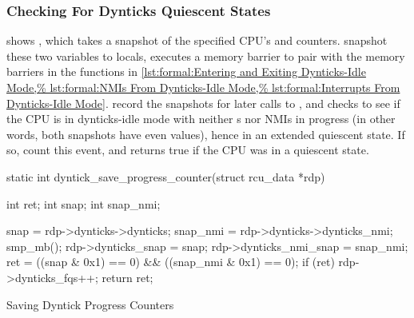\subsubsection{Checking For Dynticks Quiescent States}
\label{sec:formal:Checking For Dynticks Quiescent States}

\begin{fcvref}
shows , which takes a snapshot
of the specified CPU's  and 
counters.
 snapshot these two variables to locals, 
executes a memory barrier to pair with the memory barriers in the functions in
\cref{lst:formal:Entering and Exiting Dynticks-Idle Mode,%
lst:formal:NMIs From Dynticks-Idle Mode,%
lst:formal:Interrupts From Dynticks-Idle Mode}.
 record the snapshots for later calls to
,
and  checks to see if the CPU is in dynticks-idle mode with
neither \IRQ s nor NMIs in progress (in other words, both snapshots
have even values), hence in an extended quiescent state.
If so,  count this event, and  returns
true if the CPU was in a quiescent state.
\end{fcvref}

\begin{listing}
\begin{fcvlabel}
\begin{VerbatimL}[commandchars=\\\[\]]
static int
dyntick_save_progress_counter(struct rcu_data *rdp)
{
	int ret;
	int snap;
	int snap_nmi;

	snap = rdp->dynticks->dynticks;		\lnlbl[snap]
	snap_nmi = rdp->dynticks->dynticks_nmi;	\lnlbl[snapn]
	smp_mb();				\lnlbl[mb]
	rdp->dynticks_snap = snap;		
	rdp->dynticks_nmi_snap = snap_nmi;	
	ret = ((snap & 0x1) == 0) && ((snap_nmi & 0x1) == 0); 
	if (ret)				\lnlbl[cnt:b]
		rdp->dynticks_fqs++;		\lnlbl[cnt:e]
	return ret;				\lnlbl[ret]
}
\end{VerbatimL}
\end{fcvlabel}
\caption{Saving Dyntick Progress Counters}
\label{lst:formal:Saving Dyntick Progress Counters}
\end{listing}

